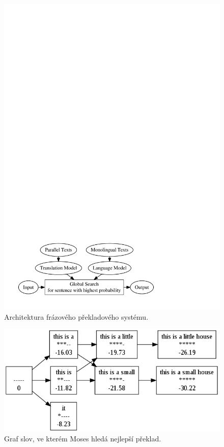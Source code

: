 \documentclass[12pt,a4paper]{report}
\begin{document}
\begin{figure}[t]
\centerline{\mbox{\includegraphics[width=120mm]{pictures/phrase-based}}}
\caption{Architektura frázového překladového systému.}
\label{phrase-based}
\end{figure}

\begin{figure}[t]
\centerline{\mbox{\includegraphics[width=120mm]{pictures/lattice}}}
\caption{Graf slov, ve kterém Moses hledá nejlepší překlad.}
\label{lattice}
\end{figure}
\end{document}
